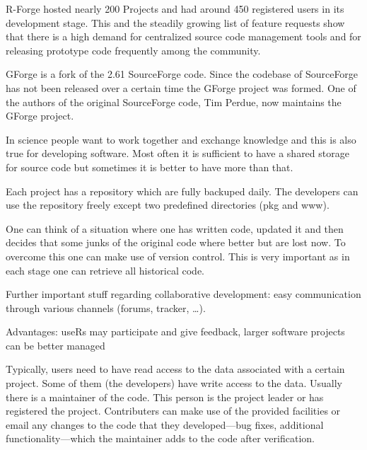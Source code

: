 
R-Forge hosted nearly 200 Projects and had around 450 registered users
in its development stage. This and the steadily growing list of
feature requests show that there is a high demand for centralized source code
management tools and for releasing prototype code frequently among the
\R community.

GForge is a fork of the 2.61 SourceForge code. Since the codebase of
SourceForge has not been released over a certain time the GForge
project was formed. One of the authors of the original SourceForge
code, Tim Perdue, now maintains the GForge project.


In science people want to work together and exchange knowledge and
this is also true for developing software. Most often it is
sufficient to have a shared storage for source code but sometimes it
is better to have more than that.

Each project has a repository which are fully backuped
daily. The developers can use the repository
freely except two predefined directories (pkg and www).


One can think of a situation where one has
written code, updated it and then decides that some junks of the
original code where better but are lost now. To overcome this one can
make use of version control. This is very important as in each stage
one can retrieve all historical code.

Further important stuff regarding collaborative development: easy
communication through various channels (forums, tracker, \ldots).

Advantages: useRs may participate and give feedback, larger software
projects can be better managed 



Typically, users need to have read access to the data associated with
a certain project. Some of them (the developers) have write access to
the data. Usually there is a maintainer of the code. This person is the project
leader or has registered the project. Contributers can make use of the
provided facilities or email any changes to the code
that they developed---bug fixes, additional functionality---which the
maintainer adds to the code after verification.

